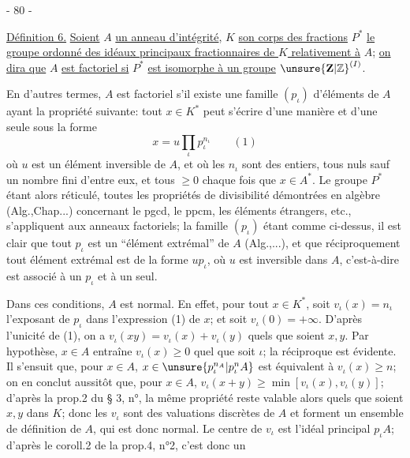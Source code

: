 \begin{center}- 80 -\end{center}

\uline{Définition 6.} \uline{Soient} $A$ \uline{un anneau d'intégrité}, $K$ \uline{son corps des fractions}
$P^*$ \uline{le groupe ordonné des idéaux principaux fractionnaires de $K$ relativement à} $A$; \uline{on dira que} $A$ \uline{est factoriel si} $P^*$ \uline{est isomorphe à un groupe} $\unsure{\mathbf Z|\mathbb Z}^{(I)}$.

En d'autres termes, $A$ est factoriel s'il existe une famille $(p_\iota)$ d'éléments de $A$ ayant la propriété suivante: tout $x\in K^*$ peut s'écrire d'une manière et d'une seule sous la forme
\[
x=u\prod_\iota p_\iota^{n_\iota}\qquad(1)
\]
où $u$ est un élément inversible de $A$, et où les $n_\iota$ sont des entiers, tous nuls sauf un nombre fini d'entre eux, et tous $\geq0$ chaque fois que $x\in A^*$. Le groupe $P^*$ étant alors réticulé, toutes les propriétés de divisibilité démontrées en algèbre (Alg.,Chap...) concernant le pgcd, le ppcm, les éléments étrangers, etc., s'appliquent aux anneaux factoriels; la famille $(p_\iota)$ étant comme ci-dessus, il est clair que tout $p_\iota$ est un ``élément extrémal'' de $A$ (Alg.,...), et que réciproquement tout élément extrémal est de la forme $up_\iota$, où $u$ est inversible dans $A$, c'est-à-dire est associé à un $p_\iota$ et à un seul.

Dans ces conditions, $A$ est normal. En effet, pour tout $x\in K^*$, soit $v_\iota(x)=n_\iota$ l'exposant de $p_\iota$ dans l'expression (1) de $x$; et soit $v_\iota(0)=+\infty$. D'après l'unicité de (1), on a $v_\iota(xy)=v_\iota(x)+v_\iota(y)$ quels que soient $x,y$. Par hypothèse, $x\in A$ entraîne $v_\iota(x)\geq0$ quel que soit $\iota$; la réciproque est évidente. Il s'ensuit que, pour $x\in A$, $x\in\unsure{p_\iota^{n_A}|p_\iota^n A}$ est équivalent à $v_\iota(x)\geq n$; on en conclut aussitôt que, pour $x\in A$, $v_\iota(x+y)\geq\min[v_\iota(x),v_\iota(y)]$; d'après la prop.2 du § 3, n°, la même propriété reste valable alors quels que soient $x,y$ dans $K$; donc les $v_\iota$ sont des valuations discrètes de $A$ et forment un ensemble de définition de $A$, qui est donc normal. Le centre de $v_\iota$ est l'idéal principal $p_\iota A$; d'après le coroll.2 de la prop.4, n°2, c'est donc un
